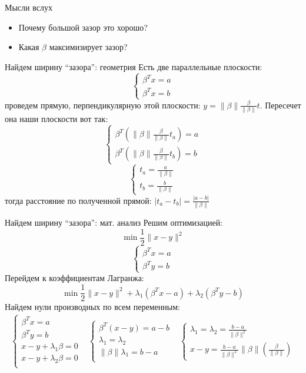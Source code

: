 \documentclass[14pt, fleqn, xcolor={dvipsnames, table}]{beamer}
\begin{document}
\begin{frame}{Мысли вслух}
\begin{itemize}
  \item Почему большой зазор это хорошо?
  \item Какая $\beta$ максимизирует зазор? 
\end{itemize}
\end{frame}

\begin{frame}{Найдем ширину ``зазора'': геометрия}
\small
Есть две параллельные плоскости:
$$\left\{\begin{array}{l}
\beta^T x = a \\
\beta^T x = b
\end{array}\right.$$
проведем прямую, перпендикулярную этой плоскости: $y=\|\beta\| \frac{\beta}{\|\beta\|} t$. Пересечет она наши плоскости вот так:
$$\left\{\begin{array}{l}
\beta^T (\|\beta\| \frac{\beta}{\|\beta\|} t_a) = a \\
\beta^T (\|\beta\| \frac{\beta}{\|\beta\|} t_b) = b
\end{array}\right.$$
$$\left\{\begin{array}{l}
t_a = \frac{a}{\|\beta\|} \\
t_b = \frac{b}{\|\beta\|}
\end{array}\right.$$
тогда расстояние по полученной прямой: $|t_a - t_b| = \frac{|a-b|}{\|\beta\|}$ 
\end{frame}

\begin{frame}{Найдем ширину ``зазора'': мат. анализ}
\footnotesize
Решим оптимизацией:
$$
\min \frac{1}{2}\|x - y\|^2
$$
$$\left\{\begin{array}{l}
\beta^T x = a \\
\beta^T y = b
\end{array}\right.
$$
Перейдем к коэффициентам Лагранжа:
$$
\min \frac{1}{2}\|x - y\|^2 + \lambda_1 (\beta^Tx - a) + \lambda_2 (\beta^Ty - b)
$$
Найдем нули производных по всем переменным:
$$
\begin{array}{lll}
\left\{\begin{array}{l}
\beta^T x = a \\
\beta^T y = b \\ 
x - y + \lambda_1 \beta = 0 \\
x - y + \lambda_2 \beta = 0 \\
\end{array}\right.
&
\left\{\begin{array}{l}
\beta^T(x - y) = a - b \\
\lambda_1 = \lambda_2 \\
\|\beta\|\lambda_1 = b - a \\
\end{array}\right.
&
\left\{\begin{array}{l}
\lambda_1 = \lambda_2 = \frac{b-a}{\|\beta\|^2} \\
x - y = \frac{b - a}{\|\beta\|^2}\|\beta\|\left(\frac{\beta}{\|\beta\|}\right)
\end{array}\right.
\end{array}$$
\end{frame}
\end{document}
